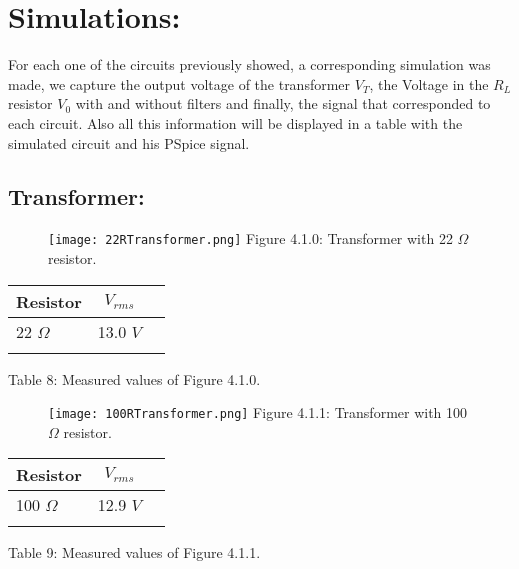 \section{Simulations:}

For each one of the circuits previously showed, a corresponding simulation was made, we capture the output voltage of the transformer {\bfseries\itshape $V_{T}$}, the Voltage in the $R_{L}$ resistor {\bfseries\itshape $V_{0}$} with and without filters and finally, the signal that corresponded to each circuit. Also all this information will be displayed in a table with the simulated circuit and his PSpice signal.

\subsection{Transformer:}

\begin{figure}[H]
\texttt{[image: 22RTransformer.png]}
\centering \linebreak \linebreak Figure 4.1.0: Transformer with 22 $\Omega$ resistor.
\end{figure}

\begin{multicols}{2}
\begin{center}
\begin{tabular}[.5cm]{l c c}
\toprule
Resistor & $V_{rms}$ \\
\midrule
22 $\Omega$ & 13.0 $V$ \\
\bottomrule
\linebreak
\end{tabular}
\centering \linebreak Table 8: Measured values of Figure 4.1.0.
\end{center} \hfill

\end{multicols}

\begin{figure}[H]
\texttt{[image: 100RTransformer.png]}
\centering \linebreak \linebreak Figure 4.1.1: Transformer with 100 $\Omega$ resistor.
\end{figure}

\begin{multicols}{2}
\begin{center}
\begin{tabular}[.5cm]{l c c}
\toprule
Resistor & $V_{rms}$ \\
\midrule
100 $\Omega$ & 12.9 $V$ \\
\bottomrule
\linebreak
\end{tabular}
\centering \linebreak Table 9: Measured values of Figure 4.1.1.
\end{center} \hfill

\end{multicols}

